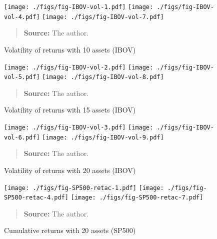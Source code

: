 \documentclass[12pt,oneside,a4paper]{memoir}
\begin{document}

\begin{figure}[htpb]
\centering
\footnotesize
\caption{Volatility of returns with 10 assets (IBOV)}
\label{fig:ibov:vol:10a}
\texttt{[image: ./figs/fig-IBOV-vol-1.pdf]}
\texttt{[image: ./figs/fig-IBOV-vol-4.pdf]}
\texttt{[image: ./figs/fig-IBOV-vol-7.pdf]}
\begin{quote}
\textbf{Source:} The author.
\end{quote}
\end{figure}

\begin{figure}[htpb]
\centering
\footnotesize
\caption{Volatility of returns with 15 assets (IBOV)}
\label{fig:ibov:vol:15a}
\texttt{[image: ./figs/fig-IBOV-vol-2.pdf]}
\texttt{[image: ./figs/fig-IBOV-vol-5.pdf]}
\texttt{[image: ./figs/fig-IBOV-vol-8.pdf]}
\begin{quote}
\textbf{Source:} The author.
\end{quote}
\end{figure}

\begin{figure}[htpb]
\centering
\footnotesize
\caption{Volatility of returns with 20 assets (IBOV)}
\label{fig:ibov:vol:20a}
\texttt{[image: ./figs/fig-IBOV-vol-3.pdf]}
\texttt{[image: ./figs/fig-IBOV-vol-6.pdf]}
\texttt{[image: ./figs/fig-IBOV-vol-9.pdf]}
\begin{quote}
\textbf{Source:} The author.
\end{quote}
\end{figure}

\clearpage

\begin{figure}[htpb]
\centering
\footnotesize
\caption{Cumulative returns with 20 assets (SP500)}
\label{fig:sp500:ret:20a}
\texttt{[image: ./figs/fig-SP500-retac-1.pdf]}
\texttt{[image: ./figs/fig-SP500-retac-4.pdf]}
\texttt{[image: ./figs/fig-SP500-retac-7.pdf]}
\begin{quote}
\textbf{Source:} The author.
\end{quote}
\end{figure}
\end{document}

